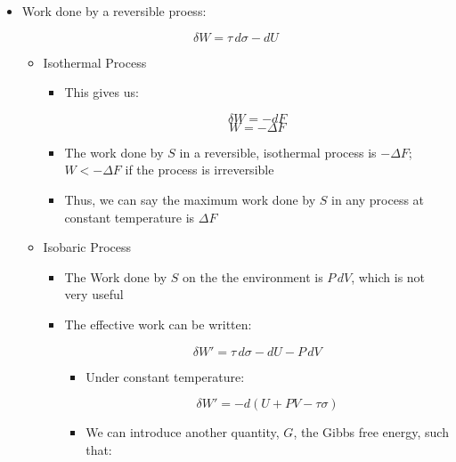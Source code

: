 \begin{itemize}
\begin{itemize}
\begin{itemize}
        \end{itemize}

    \end{itemize}

  \item Work done by a reversible proess:

    $$\delta W=\tau\,d\sigma-dU$$

    \begin{itemize}

      \item Isothermal Process

        \begin{itemize}

            $$\delta W=-d(U-\tau\sigma)$$
            $$F=U-\tau\sigma$$

          \item This gives us:

            $$\delta W=-dF$$
            $$W=-\Delta F$$

          \item The work done by $S$ in a reversible, isothermal process is $-\Delta F$; $W<-\Delta F$ if the process is irreversible

          \item Thus, we can say the maximum work done by $S$ in any process at constant temperature is $\Delta F$

        \end{itemize}

      \item Isobaric Process

        \begin{itemize}

          \item The Work done by $S$ on the the environment is $P\,dV$, which is not very useful

          \item The effective work can be written:

            $$\delta W'=\tau\,d\sigma-dU-P\,dV$$

            \begin{itemize}

              \item Under constant temperature:

                $$\delta W'=-d\left( U+PV-\tau\sigma \right)$$

              \item We can introduce another quantity, $G$, the Gibbs free energy, such that:


\end{itemize}
\end{itemize}
\end{itemize}
\end{itemize}
